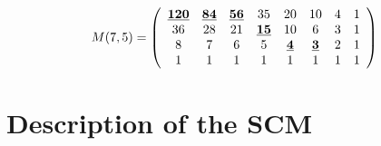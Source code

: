 \documentclass{amsart}
\begin{document}
\begin{equation} \label{eq5}
M(7,5) = \left(
\begin{array}{cccccccc}
\textbf{\underline{120}} & \textbf{\underline{84}} & \textbf{\underline{56}} & 35 & 20 & 10 & 4 & 1 \\
        36 & 28 & 21 & \textbf{\underline{15}} & 10 & 6 & 3 & 1\\
        8 & 7 & 6 & 5 & \textbf{\underline{4}} & \textbf{\underline{3}} & 2 & 1 \\
        1 & 1 & 1 & 1 & 1 & 1 & 1 & 1 \\
\end{array} \right)
\end{equation}

\section*{Description of the SCM}
\end{document}
